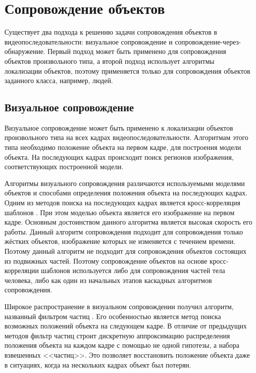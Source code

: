 \section{Сопровождение объектов}

Существует два подхода к решению задачи сопровождения объектов в видеопоследовательности: визуальное сопровождение и сопровождение-через-обнаружение. Первый подход может быть применено для сопровождения объектов произвольного типа, а второй подход использует алгоритмы локализации объектов, поэтому применяется только для сопровождения объектов заданного класса, например, людей.

\subsection{Визуальное сопровождение}

Визуальное сопровождение может быть применено к локализации объектов произвольного типа на всех кадрах видеопоследовательности. Алгоритмам этого типа необходимо положение объекта на первом кадре, для построения модели объекта. На последующих кадрах происходит поиск регионов изображения, соответствующих построенной модели.

Алгоритмы визуального сопровождения различаются используемыми моделями объектов и способами определения положения объекта на последующих кадрах. Одним из методов поиска на последующих кадрах является кросс-корреляция шаблонов \cite{freeman1998computer}. При этом моделью объекта является его изображение на первом кадре. Основным достоинством данного алгоритма является высокая скорость его работы. Данный алгоритм сопровождения подходит для сопровождения только жёстких объектов, изображение которых не изменяется с течением времени. Поэтому данный алгоритм не подходит для сопровождения объектов состоящих из подвижных частей. Поэтому сопровождение объектов на основе кросс-корреляции шаблонов используется либо для сопровождения частей тела человека, либо как один из начальных этапов каскадных алгоритмов сопровождения.

Широкое распространение в визуальном сопровождении получил алгоритм, названный фильтром частиц \cite{isard1998condensation}. Его особенностью является метод поиска возможных положений объекта на следующем кадре. В отличие от предыдущих методов фильтр частиц строит дискретную аппроксимацию распределения положения объекта на каждом кадре с помощью не одной гипотезы, а набора взвешенных <<частиц>>. Это позволяет восстановить положение объекта даже в ситуациях, когда на нескольких кадрах объект был потерян.

